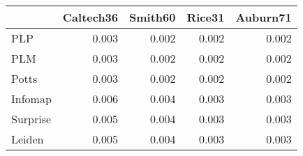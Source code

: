 \begin{tabular}{lrrrr}
\toprule
{} & Caltech36 & Smith60 & Rice31 & Auburn71 \\
\midrule
PLP      &     0.003 &   0.002 &  0.002 &    0.002 \\
PLM      &     0.003 &   0.002 &  0.002 &    0.002 \\
Potts    &     0.003 &   0.002 &  0.002 &    0.002 \\
Infomap  &     0.006 &   0.004 &  0.003 &    0.003 \\
Surprise &     0.005 &   0.004 &  0.003 &    0.003 \\
Leiden   &     0.005 &   0.004 &  0.003 &    0.003 \\
\bottomrule
\end{tabular}
